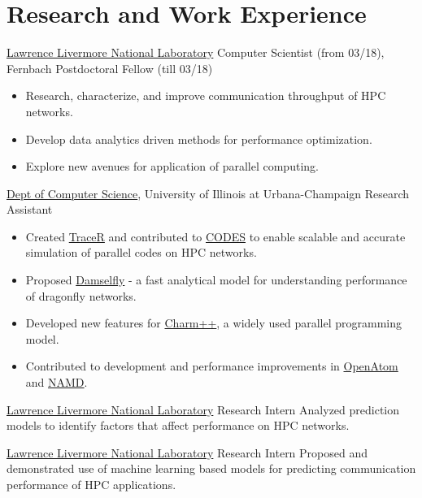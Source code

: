 \section{Research and Work Experience}
		{\href{http://www.llnl.gov}{Lawrence Livermore National Laboratory}}
		{Computer Scientist (from 03/18), Fernbach Postdoctoral Fellow (till 03/18)}
		{}{}
		{
		\begin{itemize}
		\item Research, characterize, and improve communication throughput of HPC networks.
    \item Develop data analytics driven methods for performance optimization.
    \item Explore new avenues for application of parallel computing.
		\end{itemize}
	  }
		{\href{https://cs.illinois.edu}{Dept of Computer Science}, University of Illinois at Urbana-Champaign}
		{Research Assistant}
		{}{}
		{
		\begin{itemize}
    \item Created \href{https://github.com/LLNL/tracer}{TraceR} and contributed
    to \href{https://xgitlab.cels.anl.gov/codes/codes}{CODES} to enable scalable and accurate simulation of parallel codes on HPC networks.
    \item Proposed \href{https://github.com/LLNL/damselfly}{Damselfly} - a fast
    analytical model for understanding performance of dragonfly networks.
    \item Developed new features for
    \href{https://charm.cs.illinois.edu}{Charm++}, a widely used parallel programming model.
    \item Contributed to development and performance improvements in
    \href{http://charm.cs.illinois.edu/OpenAtom/}{OpenAtom} and \href{http://www.ks.uiuc.edu/Research/namd}{NAMD}.
		\end{itemize}
    }

		{\href{http://www.llnl.gov}{Lawrence Livermore National Laboratory}}
		{Research Intern}
		{}{}
		{Analyzed prediction models to identify factors that affect performance on HPC networks.}

		{\href{http://www.llnl.gov}{Lawrence Livermore National Laboratory}}
		{Research Intern}
		{}{}
		{Proposed and demonstrated use of machine learning based models for predicting communication
    performance of HPC applications.}

